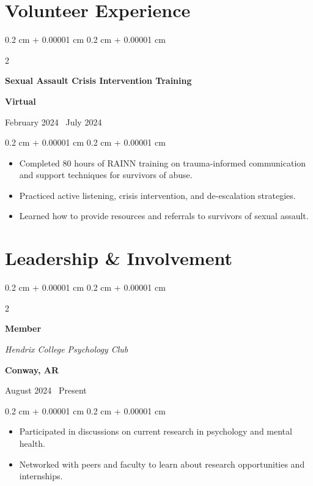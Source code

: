 \documentclass[10pt, letterpaper]{article}
\newenvironment{highlights}{
    \begin{itemize}[
        topsep=0.10 cm,
        parsep=0.10 cm,
        partopsep=0pt,
        itemsep=0pt,
        leftmargin=0.4 cm + 10pt
    ]
}{
    \end{itemize}
} %
\newenvironment{onecolentry}{
    \begin{adjustwidth}{
        0.2 cm + 0.00001 cm
    }{
        0.2 cm + 0.00001 cm
    }
}{
    \end{adjustwidth}
} %
\newenvironment{twocolentry}[2][]{
    \onecolentry
    \def\secondColumn{#2}
    \setcolumnwidth{\fill, 4.5 cm}
    \begin{paracol}{2}
}{
    \switchcolumn \raggedleft \secondColumn
    \end{paracol}
    \endonecolentry
} %
\let\hrefWithoutArrow\href
\renewcommand{\href}[2]{\hrefWithoutArrow{#1}{\ifthenelse{\equal{#2}{}}{ }{#2 }\raisebox{.15ex}{\footnotesize \faExternalLink*}}}
\begin{document}
\section{Volunteer Experience}

\begin{twocolentry}{
        \textbf{Virtual}

        February 2024 \textendash\ July 2024
    }
    \textbf{Sexual Assault Crisis Intervention Training}

    \textit{\href{https://rainn.org/}{RAINN}}


    \vspace{0.10 cm}

\end{twocolentry}

\begin{onecolentry}
    \begin{highlights}
        \item  Completed 80 hours of RAINN training on trauma-informed communication and support techniques for survivors of abuse.
        \item Practiced active listening, crisis intervention, and de-escalation strategies.
        \item Learned how to provide resources and referrals to survivors of sexual assault.
    \end{highlights}
\end{onecolentry}

\section{Leadership \& Involvement}

\begin{twocolentry}{
        \textbf{Conway, AR}

        August 2024 \textendash\ Present
    }

    \textbf{Member}

    \textit{Hendrix College Psychology Club}

    \vspace{0.10 cm}
\end{twocolentry}

\vspace{0.10 cm}
\begin{onecolentry}
    \begin{highlights}
        \item Participated in discussions on current research in psychology and mental health.
        \item Networked with peers and faculty to learn about research opportunities and internships.
    \end{highlights}
\end{onecolentry}
\end{document}
